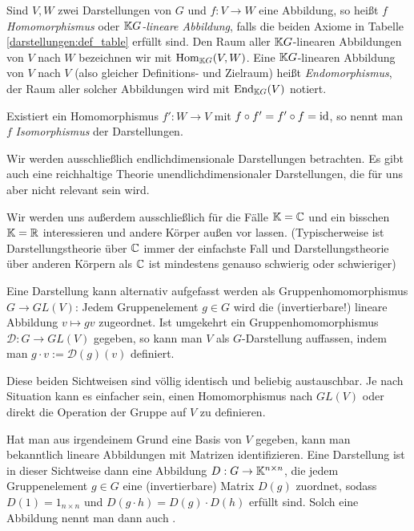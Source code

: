 \begin{definition}[Darstellungen]
Sind $V,W$ zwei Darstellungen von $G$ und $f: V\to W$ eine Abbildung, so heißt $f$ \emph{Homomorphismus} oder \emph{$\mathbb{K} G$-lineare Abbildung}, falls die beiden Axiome in Tabelle \ref{darstellungen:def_table} erfüllt sind. Den Raum aller $\mathbb{K} G$-linearen Abbildungen von $V$ nach $W$ bezeichnen wir mit $\operatorname{Hom}_{\mathbb{K} G}(V,W)$. Eine $\mathbb{K} G$-linearen Abbildung von $V$ nach $V$ (also gleicher Definitions- und Zielraum) heißt \emph{Endomorphismus}, der Raum aller solcher Abbildungen wird mit $\operatorname{End}_{\mathbb{K} G}(V)$ notiert.

Existiert ein Homomorphismus $f': W\to V$ mit $f\circ f'=f'\circ f=\operatorname{id}$, so nennt man $f$ \emph{Isomorphismus} der Darstellungen.
\end{definition}

\begin{convention}
Wir werden ausschließlich endlichdimensionale Darstellungen betrachten. Es gibt auch eine reichhaltige Theorie unendlichdimensionaler Darstellungen, die für uns aber nicht relevant sein wird.

Wir werden uns außerdem ausschließlich für die Fälle $\mathbb{K}=\mathbb{C}$ und ein bisschen $\mathbb{K}=\mathbb{R}$ interessieren und andere Körper außen vor lassen. (Typischerweise ist Darstellungstheorie über $\mathbb{C}$ immer der einfachste Fall und Darstellungstheorie über anderen Körpern als $\mathbb{C}$ ist mindestens genauso schwierig oder schwieriger)
\end{convention}

\begin{remark}
Eine Darstellung kann alternativ aufgefasst werden als Gruppenhomomorphismus $G\to GL(V)$: Jedem Gruppenelement $g\in G$ wird die (invertierbare!) lineare Abbildung $v\mapsto gv$ zugeordnet. Ist umgekehrt ein Gruppenhomomorphismus $\mathcal{D}: G\to GL(V)$ gegeben, so kann man $V$ als $G$-Darstellung auffassen, indem man $g\cdot v:=\mathcal{D}(g)(v)$ definiert.

Diese beiden Sichtweisen sind völlig identisch und beliebig austauschbar. Je nach Situation kann es einfacher sein, einen Homomorphismus nach $GL(V)$ oder direkt die Operation der Gruppe auf $V$ zu definieren.

Hat man aus irgendeinem Grund eine Basis von $V$ gegeben, kann man bekanntlich lineare Abbildungen mit Matrizen identifizieren. Eine Darstellung ist in dieser Sichtweise dann eine Abbildung ${D}: G\to \mathbb{K}^{n\times n}$, die jedem Gruppenelement $g\in G$ eine (invertierbare) Matrix $D(g)$ zuordnet, sodass $D(1)=1_{n\times n}$ und $D(g\cdot h)=D(g)\cdot D(h)$ erfüllt sind. Solch eine Abbildung nennt man dann auch .
\end{remark}

